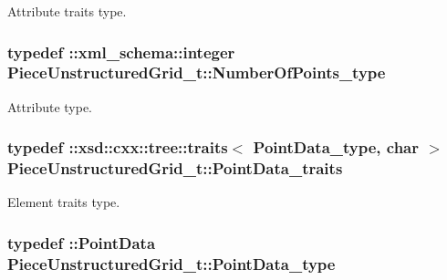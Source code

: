 Attribute traits type. 

\hypertarget{classPieceUnstructuredGrid__t_a8df1cd0d138d990e166d325ceed9a660}{}
\subsubsection[{Number\+Of\+Points\+\_\+type}]{\setlength{\rightskip}{0pt plus 5cm}typedef \+::{\bf xml\+\_\+schema\+::integer} {\bf Piece\+Unstructured\+Grid\+\_\+t\+::\+Number\+Of\+Points\+\_\+type}}\label{classPieceUnstructuredGrid__t_a8df1cd0d138d990e166d325ceed9a660}


Attribute type. 

\hypertarget{classPieceUnstructuredGrid__t_aee3c7ac7c46c4ebc9f248d31c458d300}{}
\subsubsection[{Point\+Data\+\_\+traits}]{\setlength{\rightskip}{0pt plus 5cm}typedef \+::xsd\+::cxx\+::tree\+::traits$<$ {\bf Point\+Data\+\_\+type}, char $>$ {\bf Piece\+Unstructured\+Grid\+\_\+t\+::\+Point\+Data\+\_\+traits}}\label{classPieceUnstructuredGrid__t_aee3c7ac7c46c4ebc9f248d31c458d300}


Element traits type. 

\hypertarget{classPieceUnstructuredGrid__t_a5d79d8ea03ca53f80f24e62c2175ec02}{}
\subsubsection[{Point\+Data\+\_\+type}]{\setlength{\rightskip}{0pt plus 5cm}typedef \+::{\bf Point\+Data} {\bf Piece\+Unstructured\+Grid\+\_\+t\+::\+Point\+Data\+\_\+type}}\label{classPieceUnstructuredGrid__t_a5d79d8ea03ca53f80f24e62c2175ec02}



